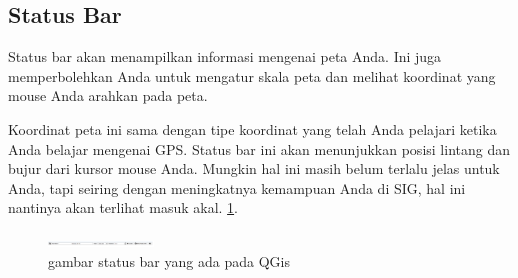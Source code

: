 \subsection{Status Bar}
Status bar akan menampilkan informasi mengenai peta Anda. Ini juga memperbolehkan Anda untuk mengatur skala peta dan melihat koordinat yang mouse Anda arahkan pada peta.

Koordinat peta ini sama dengan tipe koordinat yang telah Anda pelajari ketika Anda belajar mengenai GPS. Status bar ini akan menunjukkan posisi lintang dan bujur dari kursor mouse Anda.
Mungkin hal ini masih belum terlalu jelas untuk Anda, tapi seiring dengan meningkatnya kemampuan Anda di SIG, hal ini nantinya akan terlihat masuk akal. \ref{statbar}.
\begin{figure}[ht]
    \centerline{\includegraphics[width=0.25\textwidth]{figures/statbar.png}}
    \caption{gambar status bar yang ada pada QGis}
    \label{statbar}
    \end{figure}

